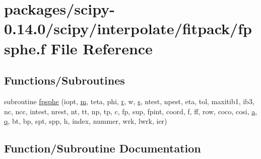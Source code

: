 \hypertarget{fpsphe_8f}{}\section{packages/scipy-\/0.14.0/scipy/interpolate/fitpack/fpsphe.f File Reference}
\label{fpsphe_8f}
\subsection*{Functions/\+Subroutines}
\begin{DoxyCompactItemize}
\item 
subroutine \hyperlink{fpsphe_8f_a561217365244adcb2f820039bea4a107}{fpsphe} (iopt, \hyperlink{indexexpr_8h_ab72fdb4031d47b75ab26dd18a437bcdc}{m}, teta, phi, \hyperlink{indexexpr_8h_ac434fd11cc2493608d8d91424d60c17e}{r}, w, \hyperlink{indexexpr_8h_ae024b0db549122b44c349ae28ec990dc}{s}, ntest, npest, eta, tol, maxitib1, ib3, nc, ncc, intest, nrest, nt, tt, np, tp, c, fp, sup, fpint, coord, f, ff, row, coco, cosi, \hyperlink{gen__mat5files_8m_aae328bf20413f220e38aec4d95bfd6da}{a}, \hyperlink{indexexpr_8h_ac886c3584e464b5533390d7440c9dd98}{q}, bt, bp, spt, spp, h, index, nummer, wrk, lwrk, ier)
\end{DoxyCompactItemize}


\subsection{Function/\+Subroutine Documentation}
\hypertarget{fpsphe_8f_a561217365244adcb2f820039bea4a107}{}

